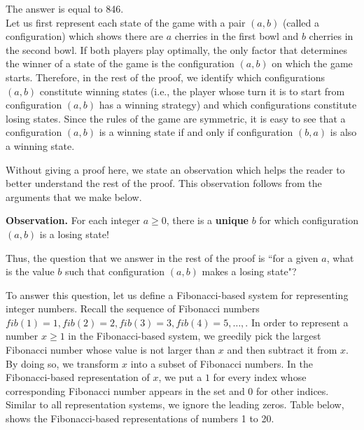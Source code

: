 \begin{solution}

The answer is equal to 846.\\[0.2cm]	

Let us first represent each state of the game with a pair $(a,b)$ (called a configuration) which shows there are $a$ cherries in the first bowl and $b$ cherries in the second bowl. If both players play optimally, the only factor that determines the winner of a state of the game is the configuration $(a,b)$ on which the game starts. Therefore, in the rest of the proof, we identify which configurations $(a,b)$ constitute winning states (i.e., the player whose turn it is to start from configuration $(a,b)$ has a winning strategy) and which configurations constitute losing states. Since the rules of the game are symmetric, it is easy to see that a configuration $(a,b)$ is a winning state if and only if configuration $(b,a)$ is also a winning state.

Without giving a proof here, we state an observation which helps the reader to better understand the rest of the proof. This observation follows from the arguments that we make below.
\begin{observation}
\textbf{Observation. }
	For each integer $a \geq 0$, there is a \textbf{unique} $b$ for which configuration $(a,b)$ is a losing state!
\end{observation}

Thus, the question that we answer in the rest of the proof is ``for a given $a$, what is the value $b$ such that configuration $(a,b)$ makes a losing state"?

To answer this question, let us define a Fibonacci-based system for representing integer numbers. Recall the sequence of Fibonacci numbers $fib(1) = 1, fib(2) = 2, fib(3) = 3, fib(4) = 5,\ldots, $. In order to represent a number $x \geq 1$ in the Fibonacci-based system, we greedily pick the largest Fibonacci number whose value is not larger than $x$ and then subtract it from $x$. By doing so, we transform $x$ into a subset of Fibonacci numbers. In the Fibonacci-based representation of $x$, we put a $1$ for every index whose corresponding Fibonacci number appears in the set and $0$ for other indices. Similar to all representation systems, we ignore the leading zeros. Table below, shows the Fibonacci-based representations of numbers 1 to 20.


\end{solution}
